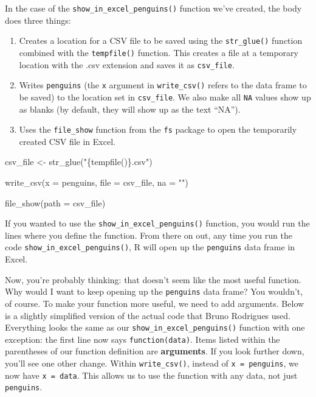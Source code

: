 \documentclass[
]{book}
\newenvironment{Shaded}{\begin{snugshade}}{\end{snugshade}}
\newcommand{\AttributeTok}[1]{\textcolor[rgb]{0.77,0.63,0.00}{#1}}
\newcommand{\FunctionTok}[1]{\textcolor[rgb]{0.00,0.00,0.00}{#1}}
\newcommand{\NormalTok}[1]{#1}
\newcommand{\OtherTok}[1]{\textcolor[rgb]{0.56,0.35,0.01}{#1}}
\newcommand{\StringTok}[1]{\textcolor[rgb]{0.31,0.60,0.02}{#1}}
\begin{document}
In the case of the \texttt{show\_in\_excel\_penguins()} function we've created, the body does three things:

\begin{enumerate}
\def\labelenumi{\arabic{enumi}.}
\item
  Creates a location for a CSV file to be saved using the \texttt{str\_glue()} function combined with the \texttt{tempfile()} function. This creates a file at a temporary location with the .csv extension and saves it as \texttt{csv\_file}.
\item
  Writes \texttt{penguins} (the \texttt{x} argument in \texttt{write\_csv()} refers to the data frame to be saved) to the location set in \texttt{csv\_file}. We also make all \texttt{NA} values show up as blanks (by default, they will show up as the text ``NA'').
\item
  Uses the \texttt{file\_show} function from the \texttt{fs} package to open the temporarily created CSV file in Excel.
\end{enumerate}

\begin{Shaded}
\begin{Highlighting}[]
\NormalTok{csv\_file }\OtherTok{\textless{}{-}} \FunctionTok{str\_glue}\NormalTok{(}\StringTok{"\{tempfile()\}.csv"}\NormalTok{)}
  
\FunctionTok{write\_csv}\NormalTok{(}\AttributeTok{x =}\NormalTok{ penguins,}
          \AttributeTok{file =}\NormalTok{ csv\_file,}
          \AttributeTok{na =} \StringTok{""}\NormalTok{)}
  
\FunctionTok{file\_show}\NormalTok{(}\AttributeTok{path =}\NormalTok{ csv\_file)}
\end{Highlighting}
\end{Shaded}

If you wanted to use the \texttt{show\_in\_excel\_penguins()} function, you would run the lines where you define the function. From there on out, any time you run the code \texttt{show\_in\_excel\_penguins()}, R will open up the \texttt{penguins} data frame in Excel.

Now, you're probably thinking: that doesn't seem like the most useful function. Why would I want to keep opening up the \texttt{penguins} data frame? You wouldn't, of course. To make your function more useful, we need to add arguments. Below is a slightly simplified version of the actual code that Bruno Rodrigues used. Everything looks the same as our \texttt{show\_in\_excel\_penguins()} function with one exception: the first line now says \texttt{function(data)}. Items listed within the parentheses of our function definition are \textbf{arguments}. If you look further down, you'll see one other change. Within \texttt{write\_csv()}, instead of \texttt{x\ =\ penguins}, we now have \texttt{x\ =\ data}. This allows us to use the function with any data, not just \texttt{penguins}.
\end{document}
